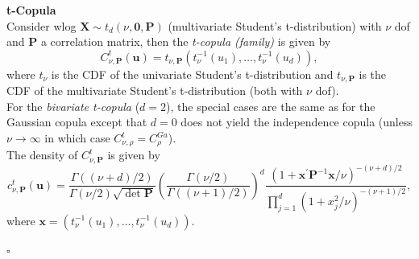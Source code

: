 \textbf{t-Copula}\\
Consider \ac{wlog} $\bm{X} \sim {t_{d}(\nu, \bm{0}, \mathbf{P})}$ (multivariate Student's t-distribution) with $\nu$ \ac{dof} and $\bm{P}$ a correlation matrix, then the \textit{t-copula (family)} is given by
\begin{equation}
C_{\nu, \bm{P}}^{t}(\mathbf{u})=t_{\nu, \bm{P}}\left(t_{\nu}^{-1}\left(u_{1}\right), \ldots, t_{\nu}^{-1}\left(u_{d}\right)\right),
\end{equation}
where $t_{\nu}$ is the \ac{CDF} of the univariate Student's t-distribution  and $t_{\nu, \bm{P}}$ is the \ac{CDF} of the multivariate Student's t-distribution (both with $\nu$ \ac{dof}).\\
For the \textit{bivariate t-copula} ($d=2$), the special cases are the same as for the Gaussian copula except that $d=0$ does not yield the independence copula (unless $\nu \rightarrow \infty$ in which case  $ C_{\nu, \rho}^{t} = C_{\rho}^{G a}$).\\
The density of $C_{\nu, \bm{P}}^{t}$ is given by
\begin{equation}
c_{\nu, \mathbf{P}}^{t}(\boldsymbol{u})=\frac{\Gamma((\nu+d) / 2)}{\Gamma(\nu / 2) \sqrt{\operatorname{det} \mathbf{P}}}\left(\frac{\Gamma(\nu / 2)}{\Gamma((\nu+1) / 2)}\right)^{d} \frac{\left(1+\boldsymbol{x}^{\prime} \mathbf{P}^{-1} \boldsymbol{x} / \nu\right)^{-(\nu+d) / 2}}{\prod_{j=1}^{d}\left(1+x_{j}^{2} / \nu\right)^{-(\nu+1) / 2}},
\end{equation}
where $\bm{x} = \left(t_{\nu}^{-1}\left(u_{1}\right), \ldots, t_{\nu}^{-1}\left(u_{d}\right)\right)$.

\hfill $\square$ \\






